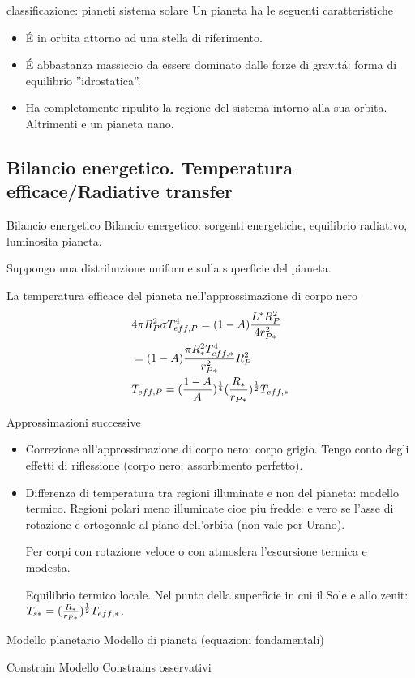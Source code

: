 \begin{wordonframe}{classificazione: pianeti sistema solare}
Un pianeta ha le seguenti caratteristiche
\begin{itemize}
    \item \'E in orbita attorno ad una stella di riferimento.
    \item \'E abbastanza massiccio da essere dominato dalle forze di gravit\'a: forma di equilibrio ''idrostatica''.
        \item Ha completamente ripulito la regione del sistema intorno alla sua orbita. Altrimenti \’e un pianeta nano.
\end{itemize}

\end{wordonframe}


\subsection{Bilancio energetico. Temperatura efficace/Radiative transfer}

\begin{frame}{Bilancio energetico}
Bilancio energetico: sorgenti energetiche, equilibrio radiativo, luminosit\’a pianeta.

Suppongo una distribuzione uniforme sulla superficie del pianeta.

La temperatura efficace del pianeta nell’approssimazione di corpo nero
\begin{align*}
&4\pi R_P^2\sigma T_{eff,P}^4=(1-A)\frac{L^*R_P^2}{4r_{P*}^2}\\
&=(1-A)\frac{\pi R_*^2T_{eff,*}^4}{r_{P*}^2}R_P^2\\
&T_{eff,P}=(\frac{1-A}{A})^{\frac{1}{4}}(\frac{R_*}{r_{P*}})^{\frac{1}{2}}T_{eff,*}
\end{align*}

Approssimazioni successive
\begin{itemize}
    \item Correzione all’approssimazione di corpo nero: corpo grigio. Tengo conto degli effetti di riflessione (corpo nero: assorbimento perfetto).
    \item Differenza di temperatura tra regioni illuminate e non del pianeta: modello termico. Regioni polari meno illuminate cio\’e pi\’u fredde: \’e vero se l’asse di rotazione \’e ortogonale al piano dell’orbita (non vale per Urano).
    
    Per corpi con rotazione veloce o con atmosfera l’escursione termica \’e modesta.
    
    Equilibrio termico locale. Nel punto della superficie in cui il Sole \’e allo zenit: $T_{s*}=(\frac{R_*}{r_{P*}})^{\frac{1}{2}}T_{eff,*}$.
\end{itemize}
\end{frame}

\begin{frame}{Modello planetario}
Modello di pianeta (equazioni fondamentali)
\end{frame}

\begin{frame}{Constrain Modello}
Constrains osservativi
\end{frame}
